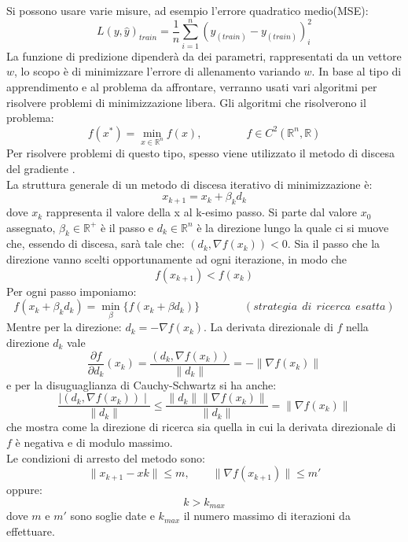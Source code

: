 \documentclass[a4paper,12pt,oneside]{book}
\begin{document}
Si possono usare varie misure, ad esempio l'errore quadratico medio(MSE):
\begin{equation}\label{train-error}
L(y,\hat{y})_{train}=\frac{1}{n}\sum_{i=1}^{n}(\hat{y}_{(train)}-y_{(train)})_{i}^2
\end{equation}
La funzione di predizione dipender\`{a} da dei parametri, rappresentati da un vettore $w$, lo scopo \`e di minimizzare l'errore di allenamento variando $w$.
In base al tipo di apprendimento e al problema da affrontare, verranno usati vari algoritmi per risolvere problemi di minimizzazione libera. Gli algoritmi che risolverono il problema:
\begin{equation}\label{minimi}
f(x^{*})=\min_{x\in \mathbb{R}^{n}}f(x),\qquad \qquad f\in C^{2}(\mathbb{R}^{n},\mathbb{R})
\end{equation}
Per risolvere problemi di questo tipo, spesso viene utilizzato il metodo di discesa del gradiente \cite{an}. \\
La struttura generale di un metodo di discesa iterativo di minimizzazione \`e:
\begin{equation}\label{eq:min}
x_{k+1}=x_{k}+\beta_{k}d_{k}
\end{equation}
dove $x_k$ rappresenta il valore della x al k-esimo passo. Si parte dal valore $x_{0}$ assegnato, $\beta_{k}\in \mathbb{R^{+}}$ \`e il passo e $d_{k}\in \mathbb{R}^{n}$ \`e la direzione lungo la quale ci si muove che, essendo di discesa, sar\`{a} tale che: $(d_{k},\nabla f(x_{k}))<0$. Sia il passo che la direzione vanno scelti opportunamente ad ogni iterazione, in modo che $$f(x_{k+1})<f(x_{k})$$
Per ogni passo imponiamo:
$$f(x_{k}+\beta_{k}d_{k})=\min_{\beta}\{f(x_{k}+\beta d_{k})\}\qquad \qquad (strategia\: \: di\: \: ricerca\: \: esatta)$$
Mentre per la direzione: $d_{k}=-\nabla f(x_{k})$. La derivata direzionale di $f$ nella direzione $d_{k}$ vale $$\frac{\partial f}{\partial d_{k}}(x_{k})=\frac{(d_{k},\nabla f(x_{k}))}{\parallel d_{k}\parallel}=-\parallel \nabla f(x_{k})\parallel$$ e per la disuguaglianza di Cauchy-Schwartz si ha anche: $$\frac{\mid (d_{k},\nabla f(x_{k}))\mid}{\parallel d_{k}\parallel}\leq \frac{\parallel d_{k} \parallel \parallel \nabla f(x_{k})\parallel}{\parallel d_{k}\parallel}=\parallel \nabla f(x_{k})\parallel$$ che mostra come la direzione di ricerca sia quella in cui la derivata direzionale di $f$ \`e negativa e di modulo massimo.\\
Le condizioni di arresto del metodo sono: 
$$\parallel x_{k+1}-x{k}\parallel \leq m,\qquad \parallel \nabla f(x_{k+1})\parallel \leq m\prime$$ oppure: $$k>k_{max}$$ dove $m$ e $m'$ sono soglie date e $k_{max}$ il numero massimo di iterazioni da effettuare.\\
\end{document}
